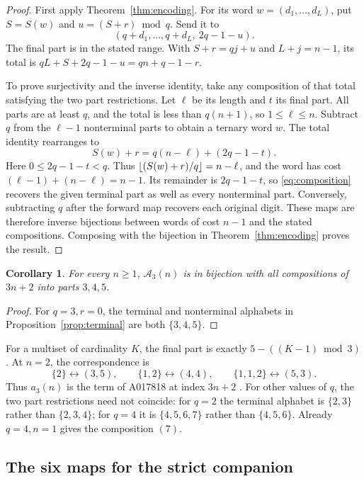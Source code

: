 \documentclass[11pt,a4paper]{article}
\newtheorem{corollary}[theorem]{Corollary}
\theoremstyle{remark}
\newcommand{\A}{\mathcal A}
\DeclarePairedDelimiter{\floor}{\lfloor}{\rfloor}
\begin{document}
\begin{proof}
First apply Theorem~\ref{thm:encoding}. For its word $w=(d_1,\ldots,d_L)$,
put $S=S(w)$ and $u=(S+r)\bmod q$. Send it to
\begin{equation}\label{eq:composition}
 (q+d_1,\ldots,q+d_L,\ 2q-1-u).
\end{equation}
The final part is in the stated range. With $S+r=qj+u$ and
$L+j=n-1$, its total is
$qL+S+2q-1-u=qn+q-1-r$.

To prove surjectivity and the inverse identity, take any composition of
that total satisfying the two part restrictions. Let $\ell$ be its
length and $t$ its final part. All parts are at least $q$, and the total
is less than $q(n+1)$, so $1\le\ell\le n$. Subtract $q$ from the
$\ell-1$ nonterminal parts to obtain a ternary word $w$. The total
identity rearranges to
\[
 S(w)+r=q(n-\ell)+(2q-1-t).
\]
Here $0\le2q-1-t<q$. Thus $\floor{(S(w)+r)/q}=n-\ell$, and the word
has cost $(\ell-1)+(n-\ell)=n-1$. Its remainder is $2q-1-t$, so
\eqref{eq:composition} recovers the given terminal part as well as every
nonterminal part. Conversely, subtracting $q$ after the forward map
recovers each original digit. These maps are therefore inverse bijections
between words of cost $n-1$ and the stated compositions. Composing with
the bijection in Theorem~\ref{thm:encoding} proves the result.
\end{proof}

\begin{corollary}\label{cor:q3}
For every $n\ge1$, $\A_3(n)$ is in bijection with all compositions of
$3n+2$ into parts $3,4,5$.
\end{corollary}

\begin{proof}
For $q=3,r=0$, the terminal and nonterminal alphabets in
Proposition~\ref{prop:terminal} are both $\{3,4,5\}$.
\end{proof}
For a multiset of cardinality $K$, the final part is exactly
$5-((K-1)\bmod3)$. At $n=2$, the correspondence is
\[
 \{2\}\longleftrightarrow(3,5),\qquad
 \{1,2\}\longleftrightarrow(4,4),\qquad
 \{1,1,2\}\longleftrightarrow(5,3).
\]
Thus $a_3(n)$ is the term of A017818 at index $3n+2$ \cite{OEIS017818}.
For other values of $q$, the two part restrictions need not coincide: for $q=2$ the
terminal alphabet is $\{2,3\}$ rather than $\{2,3,4\}$; for $q=4$ it is
$\{4,5,6,7\}$ rather than $\{4,5,6\}$. Already $q=4,n=1$ gives the
composition $(7)$.

\subsection{The six maps for the strict companion}
\end{document}
